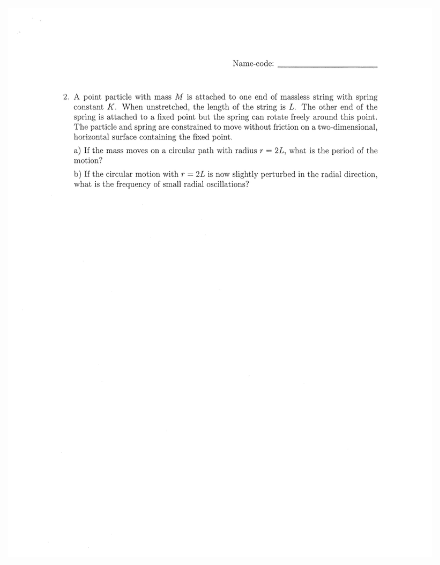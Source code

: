 \documentclass[10pt,a4paper]{article}
\begin{document}
\begin{figure}[H]
 \centering
 \includegraphics[width=16cm]{pdf/1-1T55.png}
\end{figure}
 \newpage
\end{document}
